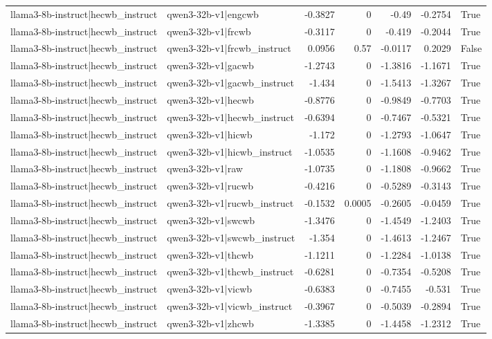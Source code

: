 \begin{table}
\begin{tabular}{l l r r r r l}
llama3-8b-instruct|hecwb_instruct & qwen3-32b-v1|engcwb & -0.3827 & 0 & -0.49 & -0.2754 & True \\
llama3-8b-instruct|hecwb_instruct & qwen3-32b-v1|frcwb & -0.3117 & 0 & -0.419 & -0.2044 & True \\
llama3-8b-instruct|hecwb_instruct & qwen3-32b-v1|frcwb_instruct & 0.0956 & 0.57 & -0.0117 & 0.2029 & False \\
llama3-8b-instruct|hecwb_instruct & qwen3-32b-v1|gacwb & -1.2743 & 0 & -1.3816 & -1.1671 & True \\
llama3-8b-instruct|hecwb_instruct & qwen3-32b-v1|gacwb_instruct & -1.434 & 0 & -1.5413 & -1.3267 & True \\
llama3-8b-instruct|hecwb_instruct & qwen3-32b-v1|hecwb & -0.8776 & 0 & -0.9849 & -0.7703 & True \\
llama3-8b-instruct|hecwb_instruct & qwen3-32b-v1|hecwb_instruct & -0.6394 & 0 & -0.7467 & -0.5321 & True \\
llama3-8b-instruct|hecwb_instruct & qwen3-32b-v1|hicwb & -1.172 & 0 & -1.2793 & -1.0647 & True \\
llama3-8b-instruct|hecwb_instruct & qwen3-32b-v1|hicwb_instruct & -1.0535 & 0 & -1.1608 & -0.9462 & True \\
llama3-8b-instruct|hecwb_instruct & qwen3-32b-v1|raw & -1.0735 & 0 & -1.1808 & -0.9662 & True \\
llama3-8b-instruct|hecwb_instruct & qwen3-32b-v1|rucwb & -0.4216 & 0 & -0.5289 & -0.3143 & True \\
llama3-8b-instruct|hecwb_instruct & qwen3-32b-v1|rucwb_instruct & -0.1532 & 0.0005 & -0.2605 & -0.0459 & True \\
llama3-8b-instruct|hecwb_instruct & qwen3-32b-v1|swcwb & -1.3476 & 0 & -1.4549 & -1.2403 & True \\
llama3-8b-instruct|hecwb_instruct & qwen3-32b-v1|swcwb_instruct & -1.354 & 0 & -1.4613 & -1.2467 & True \\
llama3-8b-instruct|hecwb_instruct & qwen3-32b-v1|thcwb & -1.1211 & 0 & -1.2284 & -1.0138 & True \\
llama3-8b-instruct|hecwb_instruct & qwen3-32b-v1|thcwb_instruct & -0.6281 & 0 & -0.7354 & -0.5208 & True \\
llama3-8b-instruct|hecwb_instruct & qwen3-32b-v1|vicwb & -0.6383 & 0 & -0.7455 & -0.531 & True \\
llama3-8b-instruct|hecwb_instruct & qwen3-32b-v1|vicwb_instruct & -0.3967 & 0 & -0.5039 & -0.2894 & True \\
llama3-8b-instruct|hecwb_instruct & qwen3-32b-v1|zhcwb & -1.3385 & 0 & -1.4458 & -1.2312 & True \\

\end{tabular}
\end{table}
